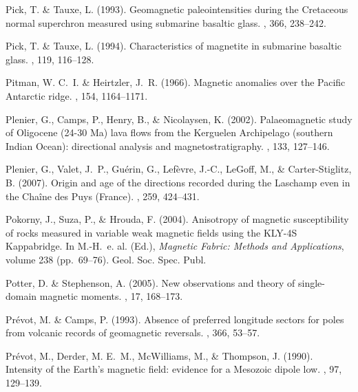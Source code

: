 \documentclass[11pt]{book}
\begin{document}
\begin{thebibliography}{}
Pick, T. \& Tauxe, L. (1993).
\newblock Geomagnetic paleointensities during the Cretaceous normal superchron
  measured using submarine basaltic glass.
, 366, 238--242.

Pick, T. \& Tauxe, L. (1994).
\newblock Characteristics of magnetite in submarine basaltic glass.
, 119, 116--128.

Pitman, W. C.~I. \& Heirtzler, J.~R. (1966).
\newblock Magnetic anomalies over the Pacific Antarctic ridge.
, 154, 1164--1171.

Plenier, G., Camps, P., Henry, B., \& Nicolaysen, K. (2002).
\newblock Palaeomagnetic study of Oligocene (24-30 Ma) lava flows from the
  Kerguelen Archipelago (southern Indian Ocean): directional analysis and
  magnetostratigraphy.
, 133, 127--146.

Plenier, G., Valet, J.~P., Gu\'erin, G., Lef\`evre, J.-C., LeGoff, M., \&
  Carter-Stiglitz, B. (2007).
\newblock Origin and age of the directions recorded during the Laschamp even in
  the Cha\^ine des Puys (France).
, 259, 424--431.

Pokorny, J., Suza, P., \& Hrouda, F. (2004).
\newblock Anisotropy of magnetic susceptibility of rocks measured in variable
  weak magnetic fields using the KLY-4S Kappabridge.
\newblock In M.-H.~e. al. (Ed.), {\em Magnetic Fabric: Methods and
  Applications}, volume 238  (pp.\ 69--76). Geol. Soc. Spec. Publ.

Potter, D. \& Stephenson, A. (2005).
\newblock New observations and theory of single-domain magnetic moments.
, 17, 168--173.

Pr\'evot, M. \& Camps, P. (1993).
\newblock Absence of preferred longitude sectors for poles from volcanic
  records of geomagnetic reversals.
, 366, 53--57.

Pr\'evot, M., Derder, M. E.~M., McWilliams, M., \& Thompson, J. (1990).
\newblock Intensity of the Earth's magnetic field: evidence for a Mesozoic
  dipole low.
, 97, 129--139.


\end{thebibliography}
\end{document}
